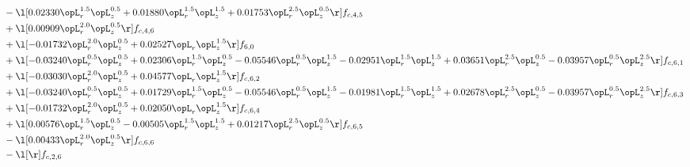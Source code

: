 \begin{alignat}{2}
& - \l[  0.02330 \opL_r^{1.5} \opL_z^{0.5} +  0.01880 \opL_r^{1.5} \opL_z^{1.5} +  0.01753 \opL_r^{2.5} \opL_z^{0.5}  \r] f_{c,4,5} \nonumber \\ 
& + \l[  0.00909 \opL_r^{2.0} \opL_z^{0.5}  \r] f_{c,4,6} \nonumber \\ 
& + \l[  -0.01732 \opL_r^{2.0} \opL_z^{0.5} +  0.02527 \opL_r \opL_z^{1.5}  \r] f_{6,0} \nonumber \\ 
& + \l[  -0.03240 \opL_r^{0.5} \opL_z^{0.5} +  0.02306 \opL_r^{1.5} \opL_z^{0.5}   -0.05546 \opL_r^{0.5} \opL_z^{1.5}   -0.02951 \opL_r^{1.5} \opL_z^{1.5} +  0.03651 \opL_r^{2.5} \opL_z^{0.5}   -0.03957 \opL_r^{0.5} \opL_z^{2.5}  \r] f_{c,6,1} \nonumber \\ 
& + \l[  -0.03030 \opL_r^{2.0} \opL_z^{0.5} +  0.04577 \opL_r \opL_z^{1.5}  \r] f_{c,6,2} \nonumber \\ 
& + \l[  -0.03240 \opL_r^{0.5} \opL_z^{0.5} +  0.01729 \opL_r^{1.5} \opL_z^{0.5}   -0.05546 \opL_r^{0.5} \opL_z^{1.5}   -0.01981 \opL_r^{1.5} \opL_z^{1.5} +  0.02678 \opL_r^{2.5} \opL_z^{0.5}   -0.03957 \opL_r^{0.5} \opL_z^{2.5}  \r] f_{c,6,3} \nonumber \\ 
& + \l[  -0.01732 \opL_r^{2.0} \opL_z^{0.5} +  0.02050 \opL_r \opL_z^{1.5}  \r] f_{c,6,4} \nonumber \\ 
& + \l[  0.00576 \opL_r^{1.5} \opL_z^{0.5}   -0.00505 \opL_r^{1.5} \opL_z^{1.5} +  0.01217 \opL_r^{2.5} \opL_z^{0.5}  \r] f_{c,6,5} \nonumber \\ 
& - \l[  0.00433 \opL_r^{2.0} \opL_z^{0.5}  \r] f_{c,6,6} \nonumber \\ 
& - \l[  \r] f_{c,2,6} \nonumber \\ 
\end{alignat} 


